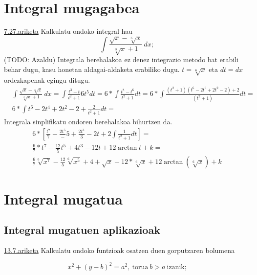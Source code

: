 \chapter{Integral mugagabea}
\underline{7.27.ariketa} Kalkulatu ondoko integral hau
\begin{equation*}
    \int \frac{\sqrt{x}-\sqrt[6]{x}}{\sqrt[3]{x}+1}\ dx;
\end{equation*}
(TODO: Azaldu)
Integrala berehalakoa ez denez integrazio metodo bat erabili behar dugu, kasu honetan aldagai-aldaketa erabiliko dugu. $t=\sqrt[6]{x}$ eta $dt=dx$ ordezkapenak egingu ditugu.
\begin{equation*}
    \begin{split}
    &\int \frac{\sqrt{x}-\sqrt[6]{x}}{\sqrt[3]{x}+1}\ dx = \int \frac{t^3-t}{t^2+1}6t^5dt = 6 * \int \frac{t^8-t^6}{t^2+1}dt =
     6 * \int \frac{(t^2+1)(t^6-2t^9+2t^2-2)+2}{(t^2+1)}dt = & 
     \\ &6 * \int t^6-2t^4+2t^2-2+\frac{2}{t^2+1}dt = &
     \end{split}
\end{equation*}
Integrala sinplifikatu ondoren berehalakoa bihurtzen da.
\begin{equation*}
     \begin{split}
     &6 * [\frac{t^7}{7}-\frac{2t^5}-{5}+\frac{2t^3}{3}-2t+2\int \frac{1}{t^2+1}dt] = &
     \\ & \frac{6}{7} * t^7 - \frac{12}{5}t^5+4t^3-12t+12\arctan{t} + k = &
     \\ &\frac{6}{7} \sqrt[6]{x^7}-\frac{12}{5}\sqrt[6]{x^5}+4+\sqrt{x}-12*\sqrt[6]{x}+12\arctan{(\sqrt[6]{x})}+k&
    \end{split}
\end{equation*}




\chapter{Integral mugatua}
\section{Integral mugatuen aplikazioak}
\underline{13.7.ariketa} Kalkulatu ondoko funtzioak osatzen duen gorputzaren bolumena

\begin{equation*}
    x^2+(y-b)^2=a^2,\ \text{torua}\ b>a \ \text{izanik;}
\end{equation*}
